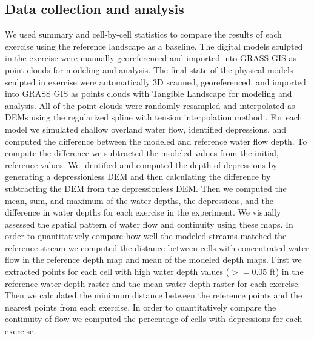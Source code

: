 \documentclass{isprs}
\begin{document}
\subsection{Data collection and analysis}
We used summary and cell-by-cell statistics to compare the results of each exercise 
using the reference landscape as a baseline. 
The digital models sculpted in the  exercise were manually georeferenced and imported into GRASS GIS as point clouds for modeling and analysis. 
The final state of the physical models sculpted in  exercise were automatically 3D scanned, georeferenced, and imported into GRASS GIS as points clouds 
with Tangible Landscape for modeling and analysis. 
All of the point clouds were randomly resampled and interpolated as DEMs using the regularized spline with tension interpolation method \cite{Mitasova2005}. 
For each model we simulated shallow overland water flow, identified depressions,
and computed the difference between the modeled and reference water flow depth. 
To compute the difference we subtracted the modeled values from the initial, reference values. %
We identified and computed the depth of depressions by generating a depressionless DEM and then calculating the difference by subtracting the DEM from the depressionless DEM.
Then we computed the mean, sum, and maximum of the water depths, the depressions, and the difference in water depths for each exercise in the experiment. 
We visually assessed the spatial pattern of water flow and continuity using these maps. 
%
In order to quantitatively compare how well the modeled streams matched the reference stream
we computed the distance between cells with concentrated water flow in the reference depth map and mean of the modeled depth maps. First we extracted points for each cell with high water depth values ($>=0.05$ ft) in the reference water depth raster and the mean water depth raster for each exercise. Then we calculated the minimum distance between the reference points and the nearest points from each exercise. 
%
In order to quantitatively compare the continuity of flow we computed the percentage of cells with depressions for each exercise.

\end{document}
